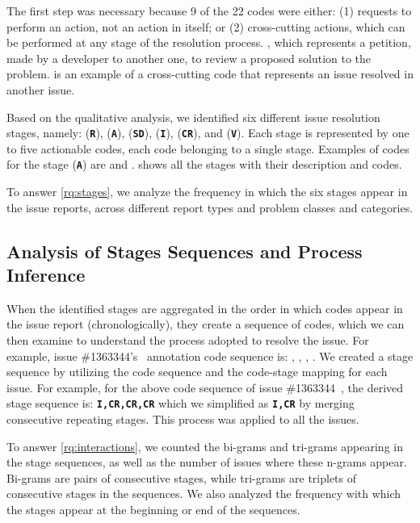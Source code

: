 The first step was necessary because 9 of the 22 codes were either: (1) requests to perform an action, not an action in itself; or (2) cross-cutting actions, which can be performed at any stage of the resolution process. {} , which represents a petition, made by a developer to another one, to review a proposed solution to the problem. 
{} is an example of a cross-cutting code that represents an issue resolved in another issue. 

Based on the qualitative analysis, we identified six different issue resolution stages, namely:
\ir (\texttt{\textbf{R}}), \ia (\texttt{\textbf{A}}), \sd (\texttt{\textbf{SD}}), \impl(\texttt{\textbf{I}}), \crv (\texttt{\textbf{CR}}), and \ver (\texttt{\textbf{V}}). Each stage is represented by one to five actionable codes, each code belonging to a single stage. Examples of codes for the \ia stage (\texttt{\textbf{A}}) are {} and 
{}.
 shows all the stages with their description and codes.

To answer \ref{rq:stages}, we analyze the frequency in which the six stages appear in the issue reports, across different report types and problem classes and categories.

\subsection{Analysis of Stages Sequences and Process Inference}
\label{sub:process}

When the identified stages are aggregated in the order in which codes appear in the issue report (\ie chronologically), they create a sequence of codes, which we can then examine to understand the process adopted to resolve the issue. For example, issue \#1363344's~\cite{firefox-bug} annotation code sequence is: 
{},  {},  {}, {}. We created a stage sequence by utilizing the code sequence and the code-stage mapping for each issue. 
For example, for the above code sequence of issue \#1363344~\cite{firefox-bug}, the derived stage sequence is: \texttt{\textbf{I,CR,CR,CR}} which we simplified as \texttt{\textbf{I,CR}} by merging consecutive repeating stages. This process was applied to all the issues.

To answer \ref{rq:interactions}, we counted the bi-grams and tri-grams appearing in the stage sequences, as well as the number of issues where these n-grams appear. Bi-grams are pairs of consecutive stages, while tri-grams are triplets of consecutive stages in the sequences. We also analyzed the frequency with which the stages appear at the beginning or end of the sequences.

